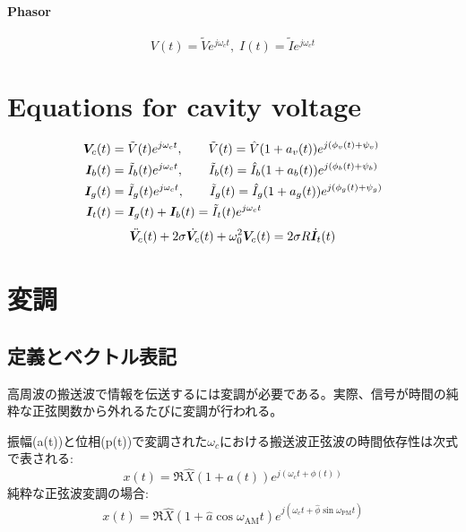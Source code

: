 \documentclass[book]{jlreq}
\begin{document}
\paragraph{Phasor}
\begin{equation}
    V(t) = \tilde{V}e^{j\omega_c t}, \; I(t) = \tilde{I}e^{j\omega_c t}
\end{equation}

\clearpage

\section{Equations for cavity voltage}
\begin{equation}
    \begin{split}
        \vb*{V}_c(t) &= \tilde{V}(t)e^{j\omega_c t},\qquad \tilde{V}(t) = \hat{V}(1+a_v(t))e^{j(\phi_v(t)+\psi_v)} \\
        \vb*{I}_b(t) &= \tilde{I}_b(t) e^{j\omega_c t},\qquad \tilde{I}_b(t) = \hat{I}_b(1+a_b(t))e^{j(\phi_b(t)+\psi_b)} \\
        \vb*{I}_g(t) &= \tilde{I}_g(t) e^{j\omega_c t},\qquad \tilde{I}_g(t) = \hat{I}_g(1+a_g(t))e^{j(\phi_g(t)+\psi_g)} \\
        \vb*{I}_t(t) &= \vb*{I}_g(t) + \vb*{I}_b(t) = \tilde{I}_t(t) e^{j\omega_c t}
    \end{split}
\end{equation}
%
%
\begin{equation}
    \ddot{\vb*{V}_c}(t) + 2 \sigma \dot{\vb*{V}_c}(t) + \omega_0^2 \vb*{V}_c(t) = 2\sigma R \dot{\vb*{I}}_t(t)
\end{equation}
%
\clearpage

\section{変調}
\subsection{定義とベクトル表記}
高周波の搬送波で情報を伝送するには変調が必要である。実際、信号が時間の純粋な正弦関数から外れるたびに変調が行われる。

振幅(a(t))と位相(p(t))で変調された$\omega_c$における搬送波正弦波の時間依存性は次式で表される:
%
\begin{equation}
    x(t) = \Re{\hat{X}(1+a(t))e^{j(\omega_c t + \phi(t))}}
\end{equation}
%
純粋な正弦波変調の場合:
%
\begin{equation}
    x(t) = \Re{\hat{X}(1 + \hat{a}\cos\omega_{\mathrm{AM}}t)e^{j(\omega_c t + \hat{\phi}\sin\omega_{\mathrm{PM}}t)}}
\end{equation}
\end{document}
